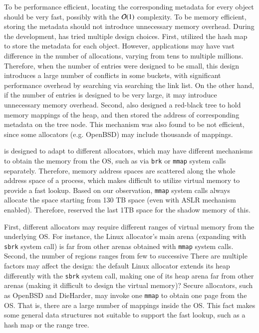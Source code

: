 To be performance efficient, locating the corresponding metadata for every object should be very fast, possibly with the $\mathcal{O}(1)$ complexity.  To be memory efficient, storing the metadata should not introduce unnecessary memory overhead. During the development, \MP{} has tried multiple design choices. First, \MP{} utilized the hash map to store the metadata for each object. However, applications may have vast difference in the number of allocations, varying from tens to multiple millions. Therefore, when the number of entries were designed to be small, this design introduces a large number of conflicts in some buckets, with significant performance overhead by searching via searching the link list. On the other hand, if the number of entries is designed to be very large, it may introduce unnecessary memory overhead. Second, \MP{} also designed a red-black tree to hold memory mappings of the heap, and then stored the address of corresponding metadata on the tree node. This mechanism was also found to be not efficient, since some allocators (e.g. OpenBSD) may include thousands of mappings.        

\MP{} is designed to adapt to different allocators, which may have different mechanisms to obtain the memory from the OS, such as via \texttt{brk} or \texttt{mmap} system calls separately. Therefore, memory address spaces are scattered along the whole address space of a process, which makes difficult to utilize virtual memory to provide a fast lookup. Based on our observation, \texttt{mmap} system calls always allocate the space starting from 130 TB space (even with ASLR mechanism enabled). Therefore, \MP{} reserved the last 1TB space for the shadow memory of this.   

First, different allocators may require different ranges of virtual memory from the underlying OS. For instance, the Linux allocator's main arena (expanding with \texttt{sbrk} system call) is far from other arenas obtained with \texttt{mmap} system calls. Second, the number of regions ranges from few to successive   
There are multiple factors may affect the design: the default Linux allocator extends its heap differently with the \texttt{sbrk} system call, making one of its heap arena far from other arenas (making it difficult to design the virtual memory)? Secure allocators, such as OpenBSD and DieHarder, may invoke one \texttt{mmap} to obtain one page from the OS. That is, there are a large number of mappings inside the OS. This fact makes some general data structures not suitable to support the fast lookup, such as a hash map or the range tree.

